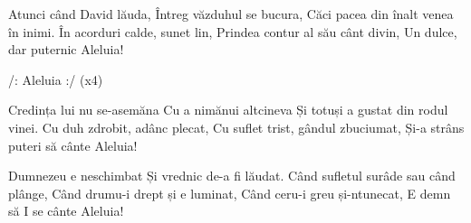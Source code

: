 
\beginverse
Atunci când David lăuda,
Întreg văzduhul se bucura,
Căci pacea din înalt venea în inimi.
În acorduri calde, sunet lin,
Prindea contur al său cânt divin,
Un dulce, dar puternic Aleluia!
\endverse

\beginchorus
/: Aleluia :/ (x4)
\endchorus

\beginverse
Credința lui nu se-asemăna
Cu a nimănui altcineva
Și totuși a gustat din rodul vinei.
Cu duh zdrobit, adânc plecat,
Cu suflet trist, gândul zbuciumat,
Și-a strâns puteri să cânte Aleluia!
\endverse

\beginverse
Dumnezeu e neschimbat
Și vrednic de-a fi lăudat.
Când sufletul surâde sau când plânge,
Când drumu-i drept și e luminat,
Când ceru-i greu și-ntunecat,
E demn să I se cânte Aleluia!
\endverse

\endsong